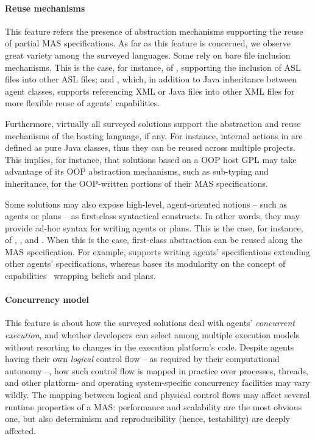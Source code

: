 \paragraph{Reuse mechanisms}
%
This feature refers the presence of abstraction mechanisms supporting the reuse of partial \ac{MAS} specifications.
As far as this feature is concerned, we observe great variety among the surveyed languages.
%
Some rely on bare file inclusion mechanisms.
%
This is the case, for instance,
of \jason{},
supporting the inclusion of ASL files into other ASL files;
and \jadex{},
which, in addition to Java inheritance between agent classes,
supports referencing XML or Java files into other XML files for more flexible reuse of agents' capabilities.

Furthermore, virtually all surveyed solutions support the abstraction and reuse mechanisms of the hosting language, if any.
%
For instance,
internal actions in \jason{} are defined as
pure Java classes,
thus they can be reused across multiple projects.
%
This implies,
for instance,
that solutions based on a \ac{OOP} host \ac{GPL} may take advantage of its \ac{OOP} abstraction mechanisms,
such as sub-typing and inheritance,
for the \ac{OOP}-written portions of their \ac{MAS} specifications.

Some solutions may also expose high-level, agent-oriented notions -- such as agents or plans -- as first-class syntactical constructs.
%
In other words, they may provide ad-hoc syntax for writing agents or plans.
%
This is the case, for instance, of \astra{}, \jack{}, and \goal{}.
%
When this is the case,
first-class abstraction can be reused along the \ac{MAS} specification.
%
For example,
\astra{} supports writing agents' specifications extending other agents' specifications,
whereas \jack{} bases its modularity on the concept of capabilities~\cite{busetta1999structuring} wrapping beliefs and plans.

\paragraph{Concurrency model}

This feature is about how the surveyed solutions deal with agents' \emph{concurrent execution},
and whether developers can select among multiple execution models
without resorting to changes in the execution platform's code.
%
Despite agents having their own \emph{logical} control flow -- as required by their computational autonomy --,
how such control flow is mapped in practice over processes, threads, and other platform- and operating system-specific concurrency facilities may vary wildly.
%
The mapping between logical and physical control flows may affect several runtime properties of a \ac{MAS}:
performance and scalability are the most obvious one,
but also determinism and
reproducibility
(hence, testability) are deeply affected.

